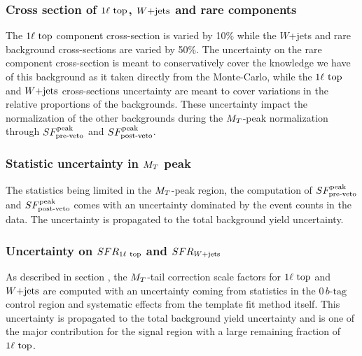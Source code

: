             \subsubsection{Cross section of $1\ell~\text{top}$, $\text{$W$+jets}$ and rare components}
        
            The $1\ell~\text{top}$ component cross-section is varied by 10\% while the $W$+jets 
            and rare background cross-sections are varied by 50\%. The uncertainty on the rare 
            component cross-section is meant to conservatively cover the knowledge we have of 
            this background as it taken directly from the Monte-Carlo, while the $1\ell~\text{top}$ and 
            $\text{$W$+jets}$ cross-sections uncertainty are meant to cover variations in the relative 
            proportions of the backgrounds. These uncertainty impact the normalization of the 
            other backgrounds during the $M_T$-peak normalization through $SF_{\text{pre-veto}}^{\text{peak}}$ and $SF_{\text{post-veto}}^{\text{peak}}$.

            \subsubsection{Statistic uncertainty in $M_T$ peak}
            
            The statistics being limited in the $M_T$-peak region, the computation of 
            $SF_{\text{pre-veto}}^{\text{peak}}$ and $SF_{\text{post-veto}}^{\text{peak}}$ comes with an uncertainty dominated by the event counts 
            in the data. The uncertainty is propagated to the total background yield uncertainty.

            \subsubsection{Uncertainty on $SFR_{1\ell~\text{top}}$ and $SFR_{\text{$W$+jets}}$}

            As described in section \label{sec:MTtailCorrection}, the $M_T$-tail correction
            scale factors for $1\ell~\text{top}$ and $\text{$W$+jets}$ are computed with an uncertainty
            coming from statistics in the $0\, b\text{-tag}$ control region and systematic effects
            from the template fit method itself. This uncertainty is propagated to the total
            background yield uncertainty and is one of the major contribution for the signal
            region with a large remaining fraction of $1\ell~\text{top}$.


